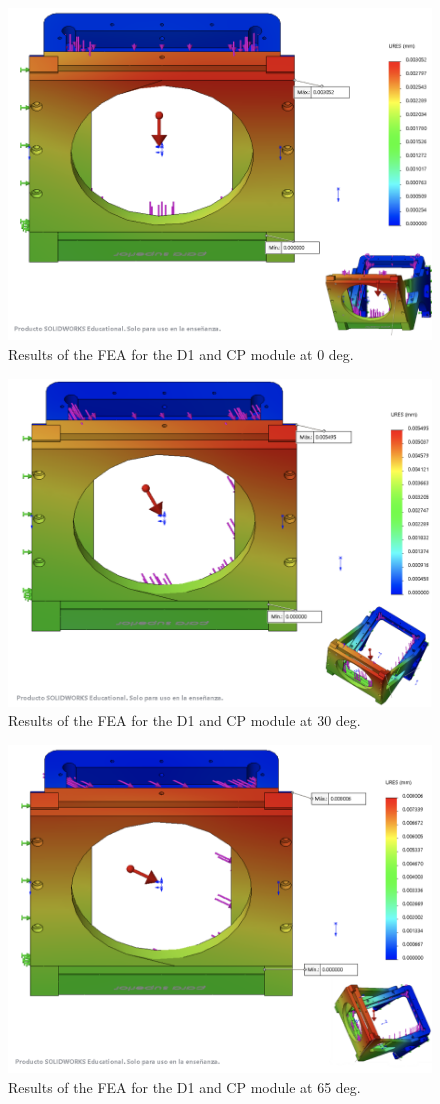 \documentclass{report}
\begin{document}
\begin{figure}
\centering
\includegraphics[width=0.8\linewidth]{figures/FEAtower0.png}
\caption{Results of the FEA for the D1 and CP module at 0 deg.}
\label{figure:FEALtower0}
\end{figure}

\begin{figure}
\centering
\includegraphics[width=0.8\linewidth]{figures/FEAtower30.png}
\caption{Results of the FEA for the D1 and CP module at 30 deg.}
\label{figure:FEALtower30}
\end{figure}

\begin{figure}
\centering
\includegraphics[width=0.8\linewidth]{figures/FEAtower65.png}
\caption{Results of the FEA for the D1 and CP module at 65 deg.}
\label{figure:FEALtower65}
\end{figure}
\end{document}

